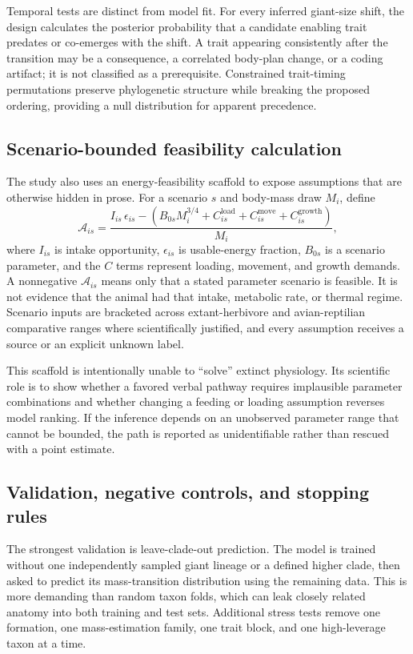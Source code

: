 \documentclass[conference]{IEEEtran}
\begin{document}
Temporal tests are distinct from model fit. For every inferred giant-size shift, the design calculates the posterior probability that a candidate enabling trait predates or co-emerges with the shift. A trait appearing consistently after the transition may be a consequence, a correlated body-plan change, or a coding artifact; it is not classified as a prerequisite. Constrained trait-timing permutations preserve phylogenetic structure while breaking the proposed ordering, providing a null distribution for apparent precedence.

\subsection{Scenario-bounded feasibility calculation}

The study also uses an energy-feasibility scaffold to expose assumptions that are otherwise hidden in prose. For a scenario $s$ and body-mass draw $M_i$, define
\begin{equation}
\mathcal{A}_{is}=\frac{I_{is}\,\epsilon_{is}-\left(B_{0s}M_i^{3/4}+C^{\mathrm{load}}_{is}+C^{\mathrm{move}}_{is}+C^{\mathrm{growth}}_{is}\right)}{M_i},
\label{eq:energy}
\end{equation}
where $I_{is}$ is intake opportunity, $\epsilon_{is}$ is usable-energy fraction, $B_{0s}$ is a scenario parameter, and the $C$ terms represent loading, movement, and growth demands. A nonnegative $\mathcal{A}_{is}$ means only that a stated parameter scenario is feasible. It is not evidence that the animal had that intake, metabolic rate, or thermal regime. Scenario inputs are bracketed across extant-herbivore and avian-reptilian comparative ranges where scientifically justified, and every assumption receives a source or an explicit unknown label.

This scaffold is intentionally unable to ``solve'' extinct physiology. Its scientific role is to show whether a favored verbal pathway requires implausible parameter combinations and whether changing a feeding or loading assumption reverses model ranking. If the inference depends on an unobserved parameter range that cannot be bounded, the path is reported as unidentifiable rather than rescued with a point estimate.

\subsection{Validation, negative controls, and stopping rules}

The strongest validation is leave-clade-out prediction. The model is trained without one independently sampled giant lineage or a defined higher clade, then asked to predict its mass-transition distribution using the remaining data. This is more demanding than random taxon folds, which can leak closely related anatomy into both training and test sets. Additional stress tests remove one formation, one mass-estimation family, one trait block, and one high-leverage taxon at a time.
\end{document}
